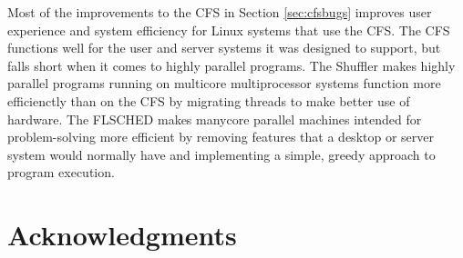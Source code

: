 \documentclass{sig-alternate}
\begin{document}
Most of the improvements to the CFS in Section \ref{sec:cfsbugs} improves user experience and system efficiency for Linux systems that use the CFS. The CFS functions well for the user and server systems it was designed to support, but falls short when it comes to highly parallel programs. The Shuffler makes highly parallel programs running on multicore multiprocessor systems function more efficienctly than on the CFS by migrating threads to make better use of hardware. The FLSCHED makes manycore parallel machines intended for problem-solving more efficient by removing features that a desktop or server system would normally have and implementing a simple, greedy approach to program execution.

\section*{Acknowledgments}
\label{sec:acknowledgments}


  
\end{document}
